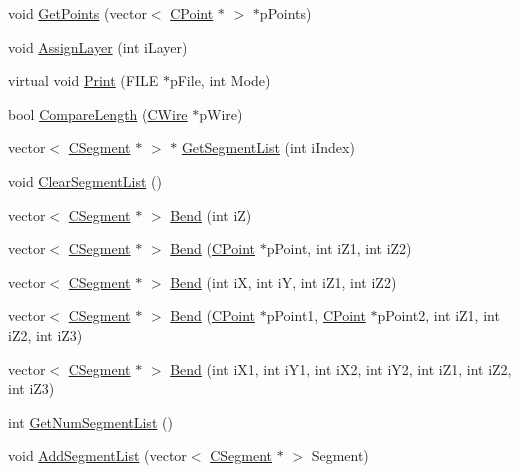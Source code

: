 \begin{DoxyCompactItemize}
\item 
void \mbox{\hyperlink{classCWire_a4799d4eeedb42ab2961ca93f25740368}{Get\+Points}} (vector$<$ \mbox{\hyperlink{classCPoint}{C\+Point}} $\ast$ $>$ $\ast$p\+Points)
\item 
void \mbox{\hyperlink{classCWire_a6d114fa68a8539380b0231f5d2d1a10a}{Assign\+Layer}} (int i\+Layer)
\item 
virtual void \mbox{\hyperlink{classCWire_a76b2e23a425ddd51f02f41ba2caf3134}{Print}} (F\+I\+LE $\ast$p\+File, int Mode)
\item 
bool \mbox{\hyperlink{classCWire_a683449c62b5625b17a78f12274d4a601}{Compare\+Length}} (\mbox{\hyperlink{classCWire}{C\+Wire}} $\ast$p\+Wire)
\item 
vector$<$ \mbox{\hyperlink{classCSegment}{C\+Segment}} $\ast$ $>$ $\ast$ \mbox{\hyperlink{classCWire_afab000638f87557894a8588f16ad0df4}{Get\+Segment\+List}} (int i\+Index)
\item 
void \mbox{\hyperlink{classCWire_a1d2f3795ad3fb276a22eaf5a10b89a36}{Clear\+Segment\+List}} ()
\item 
vector$<$ \mbox{\hyperlink{classCSegment}{C\+Segment}} $\ast$ $>$ \mbox{\hyperlink{classCWire_a5d543b640c15704e505c6b8c952f9f5d}{Bend}} (int iZ)
\item 
vector$<$ \mbox{\hyperlink{classCSegment}{C\+Segment}} $\ast$ $>$ \mbox{\hyperlink{classCWire_ae0e5ba6466563b569c4a958f8d716b99}{Bend}} (\mbox{\hyperlink{classCPoint}{C\+Point}} $\ast$p\+Point, int i\+Z1, int i\+Z2)
\item 
vector$<$ \mbox{\hyperlink{classCSegment}{C\+Segment}} $\ast$ $>$ \mbox{\hyperlink{classCWire_a1eb748fc072c27d1f1da942efe109823}{Bend}} (int iX, int iY, int i\+Z1, int i\+Z2)
\item 
vector$<$ \mbox{\hyperlink{classCSegment}{C\+Segment}} $\ast$ $>$ \mbox{\hyperlink{classCWire_a5e7f3f872777c728db89921f49bef82c}{Bend}} (\mbox{\hyperlink{classCPoint}{C\+Point}} $\ast$p\+Point1, \mbox{\hyperlink{classCPoint}{C\+Point}} $\ast$p\+Point2, int i\+Z1, int i\+Z2, int i\+Z3)
\item 
vector$<$ \mbox{\hyperlink{classCSegment}{C\+Segment}} $\ast$ $>$ \mbox{\hyperlink{classCWire_a1ffc3243c96850451394c2b121705585}{Bend}} (int i\+X1, int i\+Y1, int i\+X2, int i\+Y2, int i\+Z1, int i\+Z2, int i\+Z3)
\item 
int \mbox{\hyperlink{classCWire_a715cef9442c9cc6b45259c7291b84209}{Get\+Num\+Segment\+List}} ()
\item 
void \mbox{\hyperlink{classCWire_a4e6880d10696889c8f5f65bc628984c5}{Add\+Segment\+List}} (vector$<$ \mbox{\hyperlink{classCSegment}{C\+Segment}} $\ast$ $>$ Segment)

\end{DoxyCompactItemize}
